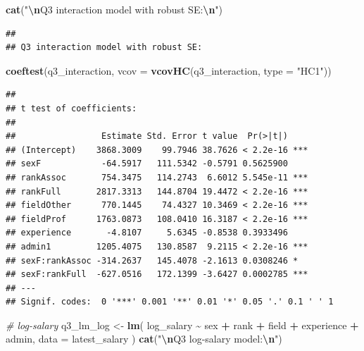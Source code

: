 \documentclass[
]{article}
\newenvironment{Shaded}{\begin{snugshade}}{\end{snugshade}}
\newcommand{\AttributeTok}[1]{\textcolor[rgb]{0.13,0.29,0.53}{#1}}
\newcommand{\CommentTok}[1]{\textcolor[rgb]{0.56,0.35,0.01}{\textit{#1}}}
\newcommand{\FunctionTok}[1]{\textcolor[rgb]{0.13,0.29,0.53}{\textbf{#1}}}
\newcommand{\NormalTok}[1]{#1}
\newcommand{\OtherTok}[1]{\textcolor[rgb]{0.56,0.35,0.01}{#1}}
\newcommand{\SpecialCharTok}[1]{\textcolor[rgb]{0.81,0.36,0.00}{\textbf{#1}}}
\newcommand{\StringTok}[1]{\textcolor[rgb]{0.31,0.60,0.02}{#1}}
\begin{document}
\begin{Shaded}
\begin{Highlighting}[]
\FunctionTok{cat}\NormalTok{(}\StringTok{"}\SpecialCharTok{\textbackslash{}n}\StringTok{Q3 interaction model with robust SE:}\SpecialCharTok{\textbackslash{}n}\StringTok{"}\NormalTok{)}
\end{Highlighting}
\end{Shaded}

\begin{verbatim}
## 
## Q3 interaction model with robust SE:
\end{verbatim}

\begin{Shaded}
\begin{Highlighting}[]
\FunctionTok{coeftest}\NormalTok{(q3\_interaction, }\AttributeTok{vcov =} \FunctionTok{vcovHC}\NormalTok{(q3\_interaction, }\AttributeTok{type =} \StringTok{"HC1"}\NormalTok{))}
\end{Highlighting}
\end{Shaded}

\begin{verbatim}
## 
## t test of coefficients:
## 
##                 Estimate Std. Error t value  Pr(>|t|)    
## (Intercept)    3868.3009    99.7946 38.7626 < 2.2e-16 ***
## sexF            -64.5917   111.5342 -0.5791 0.5625900    
## rankAssoc       754.3475   114.2743  6.6012 5.545e-11 ***
## rankFull       2817.3313   144.8704 19.4472 < 2.2e-16 ***
## fieldOther      770.1445    74.4327 10.3469 < 2.2e-16 ***
## fieldProf      1763.0873   108.0410 16.3187 < 2.2e-16 ***
## experience       -4.8107     5.6345 -0.8538 0.3933496    
## admin1         1205.4075   130.8587  9.2115 < 2.2e-16 ***
## sexF:rankAssoc -314.2637   145.4078 -2.1613 0.0308246 *  
## sexF:rankFull  -627.0516   172.1399 -3.6427 0.0002785 ***
## ---
## Signif. codes:  0 '***' 0.001 '**' 0.01 '*' 0.05 '.' 0.1 ' ' 1
\end{verbatim}

\begin{Shaded}
\begin{Highlighting}[]
\CommentTok{\# log{-}salary}
\NormalTok{q3\_lm\_log }\OtherTok{\textless{}{-}} \FunctionTok{lm}\NormalTok{(}
\NormalTok{  log\_salary }\SpecialCharTok{\textasciitilde{}}\NormalTok{ sex }\SpecialCharTok{+}\NormalTok{ rank }\SpecialCharTok{+}\NormalTok{ field }\SpecialCharTok{+}\NormalTok{ experience }\SpecialCharTok{+}\NormalTok{ admin,}
  \AttributeTok{data =}\NormalTok{ latest\_salary}
\NormalTok{)}
\FunctionTok{cat}\NormalTok{(}\StringTok{"}\SpecialCharTok{\textbackslash{}n}\StringTok{Q3 log{-}salary model:}\SpecialCharTok{\textbackslash{}n}\StringTok{"}\NormalTok{)}
\end{Highlighting}
\end{Shaded}
\end{document}
